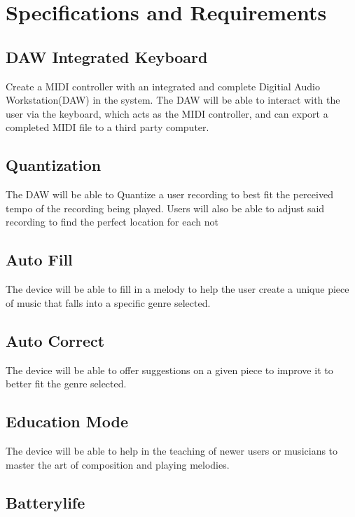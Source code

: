 \section{Specifications and Requirements}

\subsection{DAW Integrated Keyboard}

Create a MIDI controller with an integrated and complete Digitial Audio
Workstation(DAW) in the system. The DAW will be able to interact with the user
via the keyboard, which acts as the MIDI controller, and can export a completed
MIDI file to a third party computer.

\subsection{Quantization}

The DAW will be able to Quantize a user recording to best fit the perceived
tempo of the recording being played. Users will also be able to adjust said
recording to find the perfect location for each not

\subsection{Auto Fill}

The device will be able to fill in a melody to help the user create a unique
piece of music that falls into a specific genre selected.

\subsection{Auto Correct}

The device will be able to offer suggestions on a given piece to improve it to
better fit the genre selected.

\subsection{Education Mode}

The device will be able to help in the teaching of newer users or musicians to
master the art of composition and playing melodies.

\subsection{Batterylife}

